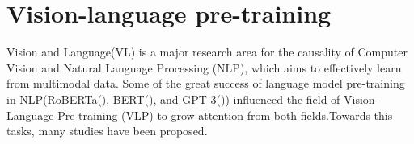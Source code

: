 

\section{Vision-language pre-training}

Vision and Language(VL) is a major research area for the causality of Computer Vision and Natural Language Processing (NLP), which aims to effectively learn from multimodal data. Some of the great success of language model pre-training in NLP(RoBERTa(\cite{liu2020roberta}), BERT(\cite{devlin2018bert}), and GPT-3(\cite{brown2020language})) influenced the field of Vision-Language Pre-training (VLP) to grow attention from both fields.Towards this tasks, many studies have been proposed.


